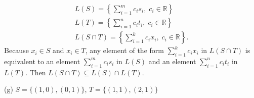 \documentclass[a4paper,12pt]{article}
\begin{document}
\begin{enumerate}
		\begin{gather*}
		L(S) = \left\{ \sum_{i = 1}^{m} c_i s_i, \; c_i \in \mathbb{R} \right\} \\
		L(T) = \left\{ \sum_{i = 1}^{n} c_i t_i, \; c_i \in \mathbb{R} \right\} \\
		L(S \cap T) = \left\{ \sum_{i = 1}^{k} c_i x_i, \; c_i \in \mathbb{R} \right\}.
		\end{gather*}
		Because $x_i \in S$ and $x_i \in T$, any element of the form $\sum_{i = 1}^{k} c_i x_i$ in $L(S \cap T)$ is equivalent to an element $\sum_{i = 1}^{m} c_i s_i$ in $L(S)$ and an element $\sum_{i = 1}^{n} c_i t_i$ in $L(T)$. Then $L(S \cap T) \subseteq L(S) \cap L(T)$.
		 \par
		(g) $S = \{(1, 0), (0, 1)\}$, $T = \{(1, 1), (2, 1)\}$ \par
	\end{enumerate}
\end{document}
